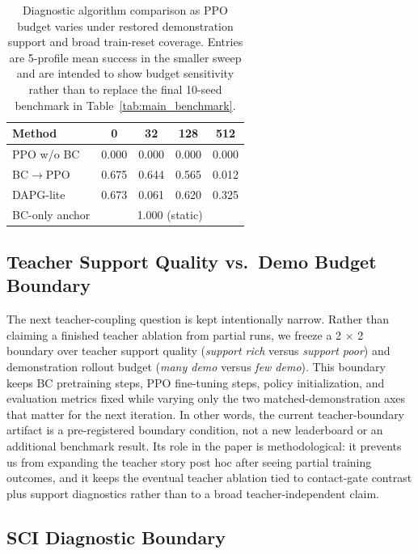 ﻿\documentclass[11pt]{article}
\begin{document}
\begin{table}[t]
  \centering
  \small
  \caption{Diagnostic algorithm comparison as PPO budget varies under restored demonstration
  support and broad train-reset coverage. Entries are 5-profile mean success in the smaller sweep
  and are intended to show budget sensitivity rather than to replace the final 10-seed benchmark
  in Table~\ref{tab:main_benchmark}.}
  \label{tab:behavioral_similarity}
  \begin{tabular}{lcccc}
    \toprule
    Method & 0 & 32 & 128 & 512 \\
    \midrule
    PPO w/o BC & 0.000 & 0.000 & 0.000 & 0.000 \\
    BC$\rightarrow$PPO & 0.675 & 0.644 & 0.565 & 0.012 \\
    DAPG-lite & 0.673 & 0.061 & 0.620 & 0.325 \\
    BC-only anchor & \multicolumn{4}{c}{1.000 (static)} \\
    \bottomrule
  \end{tabular}
\end{table}

\subsection{Teacher Support Quality vs.\ Demo Budget Boundary}

The next teacher-coupling question is kept intentionally narrow. Rather than claiming a finished
teacher ablation from partial runs, we freeze a 2 $\times$ 2 boundary over teacher support quality
(\emph{support rich} versus \emph{support poor}) and demonstration rollout budget
(\emph{many demo} versus \emph{few demo}). This boundary keeps BC pretraining steps, PPO
fine-tuning steps, policy initialization, and evaluation metrics fixed while varying only the two
matched-demonstration axes that matter for the next iteration. In other words, the current teacher-boundary artifact is a pre-registered boundary condition, not a new leaderboard or an additional benchmark
result. Its role in the paper is methodological: it prevents us from expanding the teacher story
post hoc after seeing partial training outcomes, and it keeps the eventual teacher ablation tied to
contact-gate contrast plus support diagnostics rather than to a broad teacher-independent claim.

\subsection{SCI Diagnostic Boundary}
\label{sec:sci-boundary}
\end{document}
